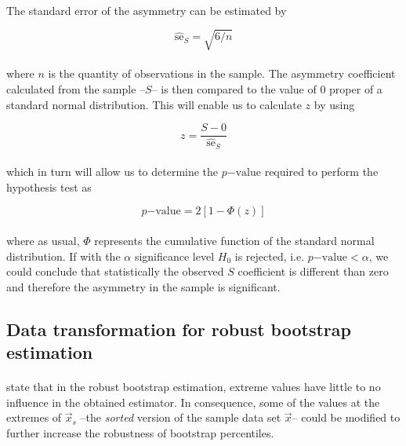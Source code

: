 \documentclass[letterpaper]{article}
\begin{document}
\paragraph{}
The standard error of the asymmetry can be estimated by

\begin{equation}
    \hat{\mathrm{se}}_S=\sqrt{6/n}
\end{equation}

\paragraph{}
where $n$ is the quantity of observations in the sample. The asymmetry coefficient calculated from the sample --$S$-- is then compared to the value of 0 proper of a standard normal distribution. This will enable us to calculate $z$ by using

\begin{equation}
    z=\frac{S-0}{\hat{\mathrm{se}}_S}
\end{equation}

\paragraph{}
which in turn will allow us to determine the $p\mathrm{-value}$ required to perform the hypothesis test as

\begin{equation}
    p\mathrm{-value}=2\left[1-\Phi(z)\right]
\end{equation}

\paragraph{}
where as usual, $\Phi$ represents the cumulative function of the standard normal distribution. If with the $\alpha$ significance level $H_0$ is rejected, i.e. $p\mathrm{-value}<\alpha$, we could conclude that statistically the observed $S$ coefficient is different than zero and therefore the asymmetry in the sample is significant.

\FloatBarrier

\subsection*{Data transformation for robust bootstrap estimation}
\paragraph{}
\cite{singh1998breakdown} state that in the robust bootstrap estimation, extreme values have little to no influence in the obtained estimator. In consequence, some of the values at the extremes of $\vec{x}_s$ --the \textit{sorted} version of the sample data set $\vec{x}$-- could be modified to further increase the robustness of bootstrap percentiles.
\end{document}

